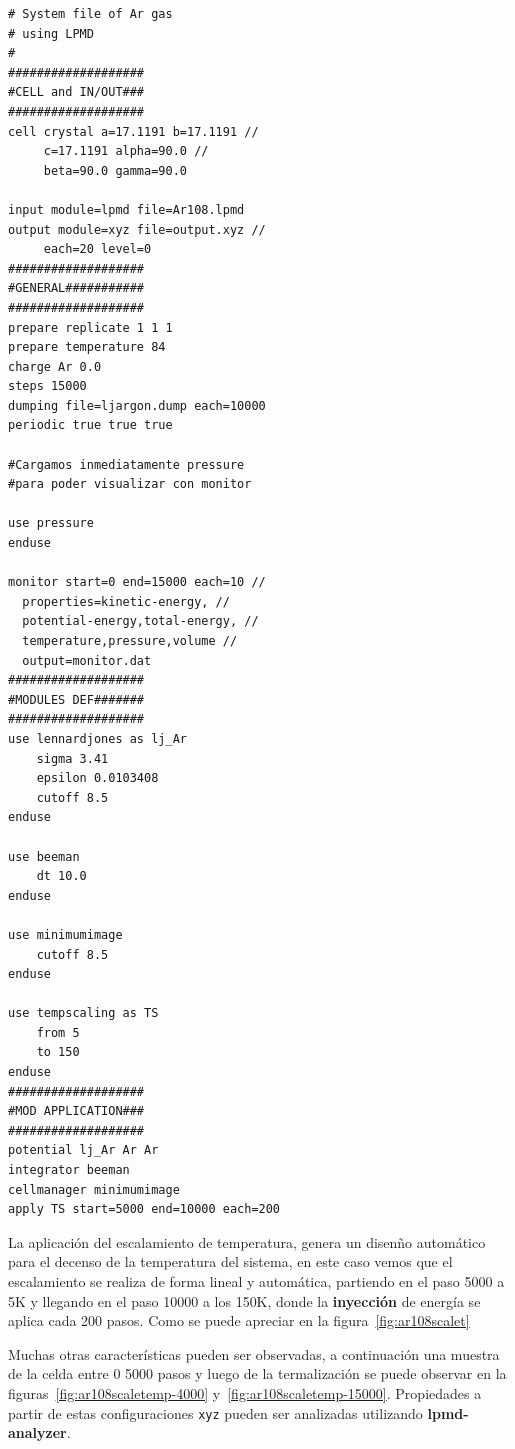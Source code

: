\begin{multicols}{2}
\setlength{\columnseprule}{.5pt}
\begin{verbatim}
# System file of Ar gas 
# using LPMD
#
###################
#CELL and IN/OUT###
###################
cell crystal a=17.1191 b=17.1191 //
     c=17.1191 alpha=90.0 //
     beta=90.0 gamma=90.0

input module=lpmd file=Ar108.lpmd
output module=xyz file=output.xyz //
     each=20 level=0
###################
#GENERAL###########
###################
prepare replicate 1 1 1
prepare temperature 84
charge Ar 0.0
steps 15000
dumping file=ljargon.dump each=10000
periodic true true true

#Cargamos inmediatamente pressure
#para poder visualizar con monitor

use pressure
enduse

monitor start=0 end=15000 each=10 //
  properties=kinetic-energy, //
  potential-energy,total-energy, //
  temperature,pressure,volume //
  output=monitor.dat
###################
#MODULES DEF#######
###################
use lennardjones as lj_Ar
    sigma 3.41
    epsilon 0.0103408
    cutoff 8.5
enduse

use beeman
    dt 10.0
enduse

use minimumimage
    cutoff 8.5
enduse

use tempscaling as TS
    from 5
    to 150
enduse
###################
#MOD APPLICATION###
###################
potential lj_Ar Ar Ar
integrator beeman
cellmanager minimumimage
apply TS start=5000 end=10000 each=200
\end{verbatim}
\end{multicols}

La aplicaci\'on del escalamiento de temperatura, genera un disen\~no autom\'atico para el decenso de la temperatura del sistema, en este caso vemos que el escalamiento se realiza de forma lineal y autom\'atica, partiendo en el paso 5000 a 5K y llegando en el paso 10000 a los 150K, donde la \textbf{inyecci\'on} de energ\'ia se aplica cada 200 pasos. Como se puede apreciar en la figura~\ref{fig:ar108scalet}


Muchas otras caracter\'isticas pueden ser observadas, a continuaci\'on una muestra de la celda entre 0 5000 pasos y luego de la termalizaci\'on se puede observar en la figuras~\ref{fig:ar108scaletemp-4000} y~\ref{fig:ar108scaletemp-15000}. Propiedades a partir de estas configuraciones \verb|xyz| pueden ser analizadas utilizando \textbf{lpmd-analyzer}.

